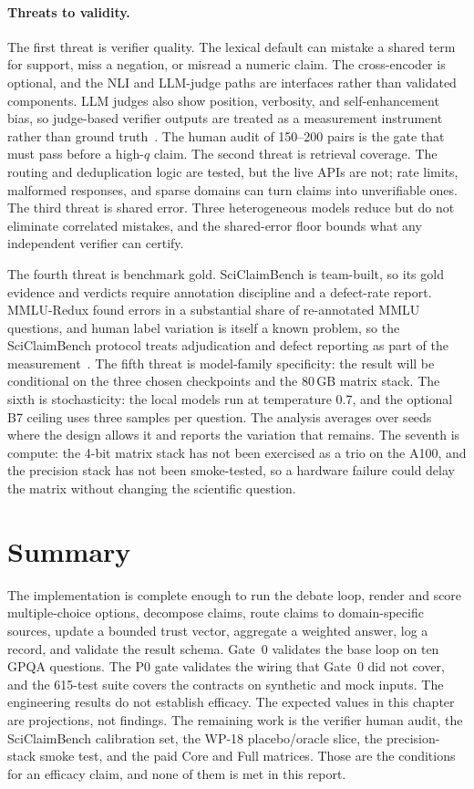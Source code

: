 \paragraph*{Threats to validity.}
The first threat is verifier quality. The lexical default can mistake a shared term for support, miss a negation, or misread a numeric claim. The cross-encoder is optional, and the NLI and LLM-judge paths are interfaces rather than validated components. LLM judges also show position, verbosity, and self-enhancement bias, so judge-based verifier outputs are treated as a measurement instrument rather than ground truth~\cite{zheng2023judging,wang2024large}. The human audit of 150--200 pairs is the gate that must pass before a high-$q$ claim. The second threat is retrieval coverage. The routing and deduplication logic are tested, but the live APIs are not; rate limits, malformed responses, and sparse domains can turn claims into unverifiable ones. The third threat is shared error. Three heterogeneous models reduce but do not eliminate correlated mistakes, and the shared-error floor bounds what any independent verifier can certify.

The fourth threat is benchmark gold. SciClaimBench is team-built, so its gold evidence and verdicts require annotation discipline and a defect-rate report. MMLU-Redux found errors in a substantial share of re-annotated MMLU questions, and human label variation is itself a known problem, so the SciClaimBench protocol treats adjudication and defect reporting as part of the measurement~\cite{gema2025mmulredux,plank2022labelvariation}. The fifth threat is model-family specificity: the result will be conditional on the three chosen checkpoints and the 80\,GB matrix stack. The sixth is stochasticity: the local models run at temperature 0.7, and the optional B7 ceiling uses three samples per question. The analysis averages over seeds where the design allows it and reports the variation that remains. The seventh is compute: the 4-bit matrix stack has not been exercised as a trio on the A100, and the precision stack has not been smoke-tested, so a hardware failure could delay the matrix without changing the scientific question.

\section{Summary}\label{sec:implementation-summary}

The implementation is complete enough to run the debate loop, render and score multiple-choice options, decompose claims, route claims to domain-specific sources, update a bounded trust vector, aggregate a weighted answer, log a record, and validate the result schema. Gate~0 validates the base loop on ten GPQA questions. The P0 gate validates the wiring that Gate~0 did not cover, and the 615-test suite covers the contracts on synthetic and mock inputs. The engineering results do not establish efficacy. The expected values in this chapter are projections, not findings. The remaining work is the verifier human audit, the SciClaimBench calibration set, the WP-18 placebo/oracle slice, the precision-stack smoke test, and the paid Core and Full matrices. Those are the conditions for an efficacy claim, and none of them is met in this report.
